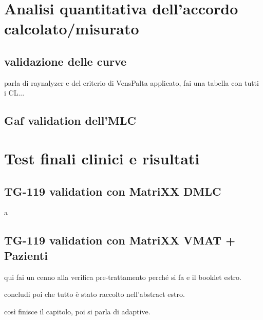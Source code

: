 \section{Analisi quantitativa dell'accordo calcolato/misurato}


\subsection{validazione delle curve}
parla di raynalyzer e del criterio di VensPalta applicato, fai una tabella con tutti i CL...
\subsection{Gaf validation dell'MLC}


\section{Test finali clinici e risultati}
\subsection{TG-119 validation con MatriXX DMLC}
a
\subsection{TG-119 validation con MatriXX VMAT + Pazienti}
qui fai un cenno alla verifica pre-trattamento perché si fa e il booklet estro.

concludi poi che tutto è stato raccolto nell'abstract estro.

così finisce il capitolo, poi si parla di adaptive.















